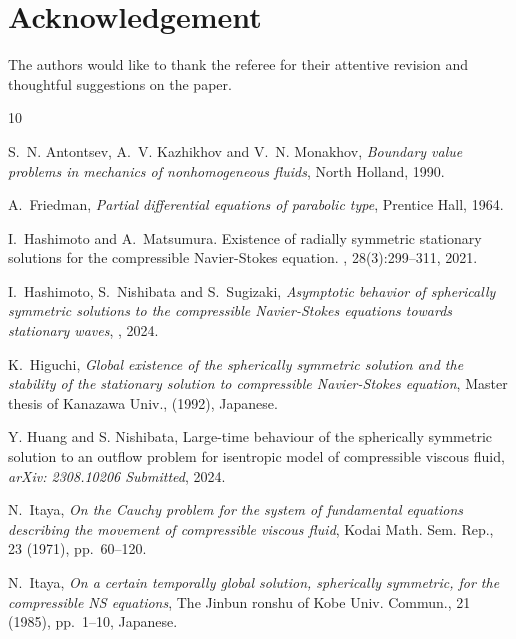 \documentclass[a4paper,12pt,draft]{article}
\theoremstyle{remark}
\begin{document}
\section*{Acknowledgement}
The authors would like to thank the referee for their attentive revision and thoughtful suggestions on the paper.

\begin{thebibliography}{10}

\footnotesize

{\sc S.~N. Antontsev, A.~V. Kazhikhov and V.~N. Monakhov}, {\em Boundary value
  problems in mechanics of nonhomogeneous fluids}, North Holland, 1990.

{\sc A.~Friedman}, {\em Partial differential equations of parabolic type},
  Prentice Hall, 1964.
  
I.~Hashimoto and A.~Matsumura.
\newblock Existence of radially symmetric stationary solutions for the
compressible {N}avier-{S}tokes equation.
, 28(3):299--311, 2021.

{\sc I.~Hashimoto, S.~Nishibata and S.~Sugizaki}, {\em Asymptotic behavior of spherically symmetric solutions to the compressible Navier-Stokes equations towards stationary waves}, , 2024.


{\sc K.~Higuchi}, {\em Global existence of the spherically symmetric solution
  and the stability of the stationary solution to compressible
  {N}avier-{S}tokes equation}, Master thesis of Kanazawa Univ.,  (1992),
\newblock Japanese.

 Y. Huang and S. Nishibata, Large-time behaviour of the spherically symmetric solution to an outflow problem for isentropic model of compressible viscous fluid, \textit{arXiv: 2308.10206 Submitted}, 2024.

{\sc N.~Itaya}, {\em On the {C}auchy problem for the system of fundamental
  equations describing the movement of compressible viscous fluid}, Kodai Math.
  Sem. Rep., 23 (1971), pp.~60--120.


{\sc N.~Itaya}, {\em On a certain
  temporally global solution, spherically symmetric, for the compressible {NS}
  equations}, The Jinbun ronshu of Kobe Univ. Commun., 21 (1985), pp.~1--10,
\newblock Japanese.


\end{thebibliography}
\end{document}
